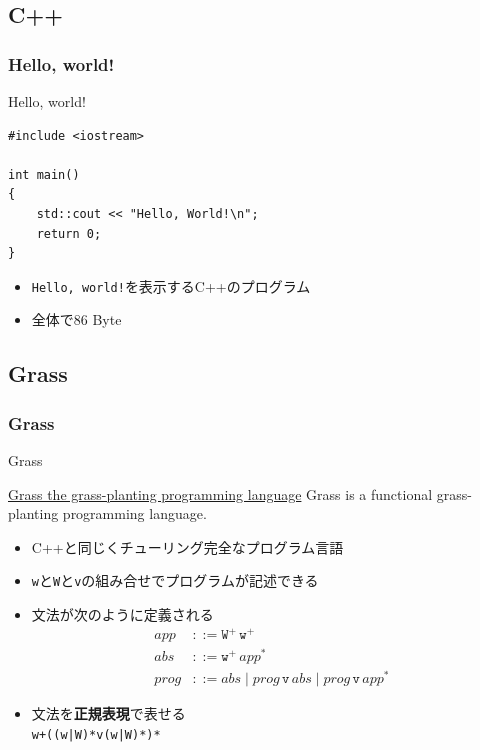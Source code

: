 \documentclass[12pt, unicode, svgnames]{beamer}
\begin{document}
\subsection{C++}
\begin{frame}[fragile]
  \frametitle{Hello, world!}

  \begin{exampleblock}{Hello, world!}
\begin{lstlisting}[style=cpp]
#include <iostream>

int main()
{
    std::cout << "Hello, World!\n";
    return 0;
}
\end{lstlisting}
  \end{exampleblock}

  \begin{itemize}
    \item<2-> \texttt{Hello, world!}を表示するC++のプログラム
    \item<3-> 全体で86 Byte
  \end{itemize}

\end{frame}

\subsection{Grass}
\begin{frame}[fragile]
  \frametitle{Grass}

  \begin{block}{Grass}
    \begin{shadequote}[r]{\scriptsize\href{http://www.blue.sky.or.jp/grass/}{Grass the grass-planting programming language}}
      Grass is a functional grass-planting programming language.
    \end{shadequote}
  \end{block}

  \begin{itemize}
    \item<2-> C++と同じくチューリング完全なプログラム言語
    \item<3-> \texttt{w}と\texttt{W}と\texttt{v}の組み合せでプログラムが記述できる
    \item<4-> 文法が次のように定義される
      \begin{align*}
        app &::= \mathtt{W}^+\, \mathtt{w}^+ \\
        abs &::= \mathtt{w}^+\, app^* \\
        prog &::= abs \mid prog\, \mathtt{v}\, abs \mid prog\, \mathtt{v}\, app^* 
      \end{align*}
    \item<5-> 文法を\textbf{正規表現}で表せる \\
      \lstinline{w+((w|W)*v(w|W)*)*}
  \end{itemize}
\end{frame}
\end{document}
